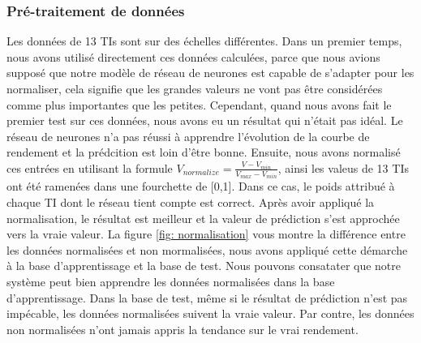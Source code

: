\subsubsection{Pré-traitement de données}

Les données de 13 TIs sont sur des échelles différentes. Dans un premier temps, nous avons utilisé directement ces données calculées, parce que nous avions supposé que notre modèle de réseau de neurones est capable de s'adapter pour les normaliser, cela signifie que les grandes valeurs ne vont pas être considérées comme plus importantes que les petites. Cependant, quand nous avons fait le premier test sur ces données, nous avons eu un résultat qui n’était pas idéal. Le réseau de neurones n'a pas réussi à apprendre l'évolution de la courbe de rendement et la prédcition est loin d'être bonne. Ensuite, nous avons normalisé ces entrées en utilisant la formule $ V_{normalize} = \frac{V-V_{min}}{V_{max}-V_{min}}$, ainsi les valeus de 13 TIs ont été ramenées dans une fourchette de [0,1]. Dans ce cas, le poids attribué à chaque TI dont le réseau tient compte est correct. Après avoir appliqué la normalisation, le résultat est meilleur et la valeur de prédiction s'est approchée vers la vraie valeur. La figure \ref{fig: normalisation} vous montre la différence entre les données normalisées et non mormalisées, nous avons appliqué cette démarche à la base d'apprentissage et la base de test. Nous pouvons consatater que notre système peut bien apprendre les données normalisées dans la base d'apprentissage. Dans la base de test, même si le résultat de prédiction n'est pas impécable, les données normalisées suivent la vraie valeur. Par contre, les données non normalisées n'ont jamais appris la tendance sur le vrai rendement. 

